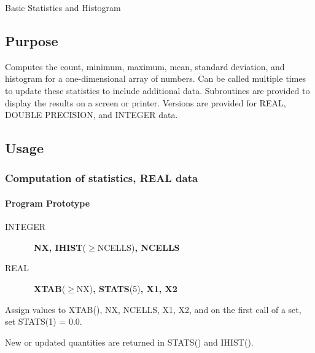 \documentclass[twoside]{MATH77}
\begin{document}
 Basic Statistics and Histogram


\subsection{Purpose}

Computes the count, minimum, maximum, mean, standard deviation, and histogram
for a one-dimensional array of numbers. Can be called multiple times to update
these statistics to include additional data. Subroutines are provided to
display the results on a screen or printer. Versions are provided for REAL,
DOUBLE PRECISION, and INTEGER data.

\subsection{Usage}

\subsubsection{Computation of statistics, REAL data}

\paragraph{Program Prototype}

\begin{description}
\item[INTEGER]  \ {\bf NX, IHIST}($\geq $NCELLS){\bf , NCELLS}

\item[REAL]  \ {\bf XTAB}($\geq $NX){\bf , STATS}(5){\bf , X1, X2}
\end{description}

Assign values to XTAB(), NX, NCELLS, X1, X2, and on the first call of
a set, set STATS(1) = 0.0.

\begin{center}
\end{center}

New or updated quantities are returned in STATS() and IHIST().
\end{document}
